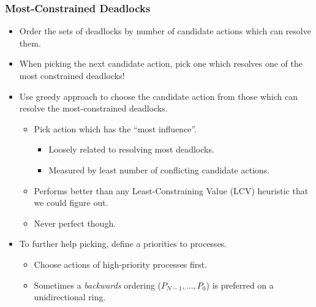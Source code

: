 \documentclass[handout]{beamer}
\begin{document}
\begin{frame}
\frametitle{Most-Constrained Deadlocks}
\begin{itemize}
\item Order the sets of deadlocks by number of candidate actions which can resolve them.
\item When picking the next candidate action, pick one which resolves one of the most constrained deadlocks!
\item Use greedy approach to choose the candidate action from those which can resolve the most-constrained deadlocks.
 \begin{itemize}
 \item Pick action which has the ``most influence''.
  \begin{itemize}
  \item Loosely related to resolving most deadlocks.
  \item Measured by least number of conflicting candidate actions.
  \end{itemize}
 \item Performs better than any Least-Constraining Value (LCV) heuristic that we could figure out.
 \item Never perfect though.
 \end{itemize}
\item To further help picking, define a priorities to processes.
 \begin{itemize}
 \item Choose actions of high-priority processes first.
 \item Sometimes a {\it backwards} ordering ($P_{N-1},\dots,P_0$) is preferred on a unidirectional ring.
 \end{itemize}
\end{itemize}
\end{frame}

%
\end{document}
